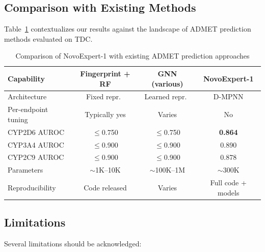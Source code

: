 \documentclass[11pt]{article}
\begin{document}
\subsection{Comparison with Existing Methods}

Table~\ref{tab:comparison} contextualizes our results against the landscape of ADMET prediction methods evaluated on TDC.

\begin{table}[h]
\centering
\caption{Comparison of NovoExpert-1 with existing ADMET prediction approaches}
\label{tab:comparison}
\begin{tabular}{lccc}
\toprule
Capability & Fingerprint + RF & GNN (various) & NovoExpert-1 \\
\midrule
Architecture & Fixed repr.\ & Learned repr.\ & D-MPNN \\
Per-endpoint tuning & Typically yes & Varies & No \\
CYP2D6 AUROC & $\leq$0.750 & $\leq$0.750 & \textbf{0.864} \\
CYP3A4 AUROC & $\leq$0.900 & $\leq$0.900 & 0.890 \\
CYP2C9 AUROC & $\leq$0.900 & $\leq$0.900 & 0.878 \\
Parameters & $\sim$1K--10K & $\sim$100K--1M & $\sim$300K \\
Reproducibility & Code released & Varies & Full code + models \\
\bottomrule
\end{tabular}
\end{table}

\subsection{Limitations}

Several limitations should be acknowledged:
\end{document}
